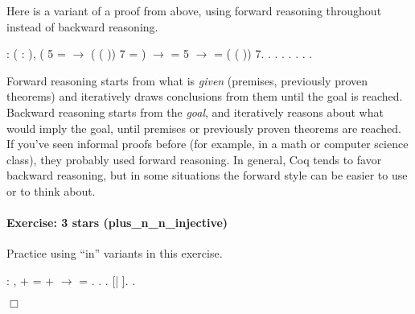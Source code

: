 \documentclass[12pt]{report}
\begin{document}
    Here is a variant of a proof from above, using forward reasoning
    throughout instead of backward reasoning. \begin{coqdoccode}
\coqdocemptyline
\coqdocnoindent
{}  : \coqdockw{\ensuremath{\forall}} ( : ),\coqdoceol
\coqdocindent{1.00em}
(  5 =  \ensuremath{\rightarrow}  ( ( )) 7 = ) \ensuremath{\rightarrow}\coqdoceol
\coqdocindent{2.50em}
 =   5  \ensuremath{\rightarrow}\coqdoceol
\coqdocindent{2.50em}
 =  ( ( )) 7.\coqdoceol
\coqdocnoindent
{}.\coqdoceol
\coqdocindent{1.00em}
   .\coqdoceol
\coqdocindent{1.00em}
  .    .   .\coqdoceol
\coqdocindent{1.00em}
 . .\coqdoceol
\coqdocemptyline
\end{coqdoccode}
Forward reasoning starts from what is \textit{given} (premises,
    previously proven theorems) and iteratively draws conclusions from
    them until the goal is reached.  Backward reasoning starts from
    the \textit{goal}, and iteratively reasons about what would imply the
    goal, until premises or previously proven theorems are reached.
    If you've seen informal proofs before (for example, in a math or
    computer science class), they probably used forward reasoning.  In
    general, Coq tends to favor backward reasoning, but in some
    situations the forward style can be easier to use or to think
    about.  

\paragraph{Exercise: 3 stars (plus\_n\_n\_injective)}

 Practice using ``in'' variants in this exercise. \begin{coqdoccode}
\coqdocemptyline
\coqdocnoindent
{}  : \coqdockw{\ensuremath{\forall}}  ,\coqdoceol
\coqdocindent{2.50em}
 +  =  +  \ensuremath{\rightarrow}\coqdoceol
\coqdocindent{2.50em}
 = .\coqdoceol
\coqdocnoindent
{}.\coqdoceol
\coqdocindent{1.00em}
 .    [| ].\coqdoceol
 .\coqdoceol
\end{coqdoccode}
\ensuremath{\Box} \begin{coqdoccode}
\coqdocemptyline
\end{coqdoccode}
\end{document}
